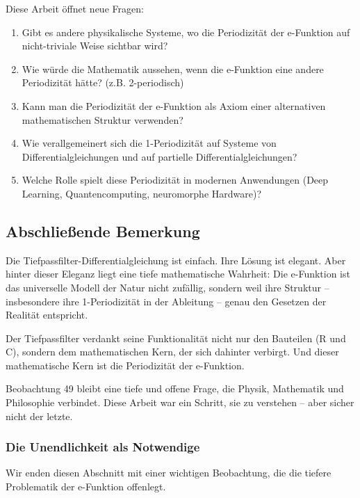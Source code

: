 \documentclass[a4paper,12pt,twoside]{report}
\theoremstyle{definition}
\begin{document}
Diese Arbeit öffnet neue Fragen:

\begin{enumerate}
	\item Gibt es andere physikalische Systeme, wo die Periodizität der e-Funktion auf nicht-triviale Weise sichtbar wird?
	
	\item Wie würde die Mathematik aussehen, wenn die e-Funktion eine andere Periodizität hätte? (z.B. 2-periodisch)
	
	\item Kann man die Periodizität der e-Funktion als Axiom einer alternativen mathematischen Struktur verwenden?
	
	\item Wie verallgemeinert sich die 1-Periodizität auf Systeme von Differentialgleichungen und auf partielle Differentialgleichungen?
	
	\item Welche Rolle spielt diese Periodizität in modernen Anwendungen (Deep Learning, Quantencomputing, neuromorphe Hardware)?
\end{enumerate}

\subsection{Abschließende Bemerkung}

Die Tiefpassfilter-Differentialgleichung ist einfach. Ihre Lösung ist elegant. Aber hinter dieser Eleganz liegt eine tiefe mathematische Wahrheit: Die e-Funktion ist das universelle Modell der Natur nicht zufällig, sondern weil ihre Struktur -- insbesondere ihre 1-Periodizität in der Ableitung -- genau den Gesetzen der Realität entspricht.

Der Tiefpassfilter verdankt seine Funktionalität nicht nur den Bauteilen (R und C), sondern dem mathematischen Kern, der sich dahinter verbirgt. Und dieser mathematische Kern ist die Periodizität der e-Funktion.

Beobachtung 49 bleibt eine tiefe und offene Frage, die Physik, Mathematik und Philosophie verbindet. Diese Arbeit war ein Schritt, sie zu verstehen -- aber sicher nicht der letzte.

\subsubsection{Die Unendlichkeit als Notwendige}

Wir enden diesen Abschnitt mit einer wichtigen Beobachtung, die die tiefere Problematik der e-Funktion offenlegt.
\end{document}
